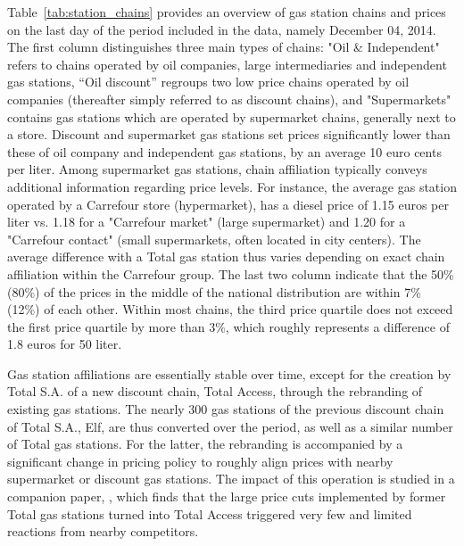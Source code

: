\documentclass[english]{article}
\begin{document}
Table~\ref{tab:station_chains} provides an overview of gas station chains and prices on the last day of the period included in the data, namely December 04, 2014. The first column distinguishes three main types of chains: "Oil \& Independent" refers to chains operated by oil companies, large intermediaries and independent gas stations, ``Oil discount'' regroups two low price chains operated by oil companies (thereafter simply referred to as discount chains), and "Supermarkets" contains gas stations which are operated by supermarket chains, generally next to a store. Discount and supermarket gas stations set prices significantly lower than these of oil company and independent gas stations, by an average 10 euro cents per liter. Among supermarket gas stations, chain affiliation typically conveys additional information regarding price levels. For instance, the average gas station operated by a Carrefour store (hypermarket), has a diesel price of 1.15 euros per liter vs. 1.18 for a "Carrefour market" (large supermarket) and 1.20 for a "Carrefour contact" (small supermarkets, often located in city centers). The average difference with a Total gas station thus varies depending on exact chain affiliation within the Carrefour group. The last two column indicate that the 50\% (80\%) of the prices in the middle of the national distribution are within 7\% (12\%) of each other. Within most chains, the third price quartile does not exceed the first price quartile by more than 3\%, which roughly represents a difference of 1.8 euros for 50 liter.

Gas station affiliations are essentially stable over time, except for the creation by Total S.A. of a new discount chain, Total Access, through the rebranding of existing gas stations. The nearly 300 gas stations of the previous discount chain of Total S.A., Elf, are thus converted over the period, as well as a similar number of Total gas stations. For the latter, the rebranding is accompanied by a significant change in pricing policy to roughly align prices with nearby supermarket or discount gas stations. The impact of this operation is studied in a companion paper, \cite{CHA16}, which finds that the large price cuts implemented by former Total gas stations turned into Total Access triggered very few and limited reactions from nearby competitors.
\end{document}
